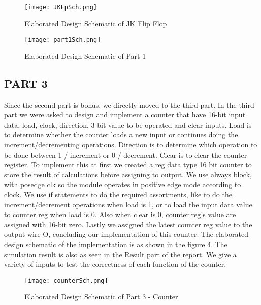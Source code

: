 \documentclass[pdftex,12pt,a4paper]{article}
\begin{document}
\begin{figure}[ht]
	\centering
	\texttt{[image: JKFpSch.png]}
	\caption{Elaborated Design Schematic of JK Flip Flop}
	\label{fig1}
\end{figure}

\begin{figure}[ht]
	\centering
	\texttt{[image: part1Sch.png]}
	\caption{Elaborated Design Schematic of Part 1}
	\label{fig1}
\end{figure}



\newpage
\subsection{PART 3}
Since the second part is bonus, we directly moved to the third part. In the third part we were asked to design and implement a counter that have 16-bit input data, load, clock, direction, 3-bit value to be operated and clear inputs. Load is to determine whether the counter loads a new input or continues doing the increment/decrementing operations. Direction is to determine which operation to be done between 1 / increment or 0 / decrement. Clear is to clear the counter register. To implement this at first we created a reg data type 16 bit counter to store the result of calculations before assigning to output. We use always block, with posedge clk so the module operates in positive edge mode according to clock. We use if statements to do the required assortments, like to do the increment/decrement operations when load is 1, or to load the input data value to counter reg when load is 0. Also when clear is 0, counter reg's value are assigned with 16-bit zero. Lastly we assigned the latest counter reg value to the output wire O, concluding our implementation of this counter. The elaborated design schematic of the implementation is as shown in the figure 4. The simulation result is also as seen in the Result part of the report. We give a variety of inputs to test the correctness of each function of the counter.


\begin{figure}[ht]
	\centering
	\texttt{[image: counterSch.png]}
	\caption{Elaborated Design Schematic of Part 3 - Counter}
	\label{fig1}
\end{figure}



\newpage
\end{document}
